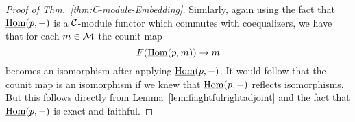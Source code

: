 \documentclass{amsart}
\begin{document}
\begin{proof}[Proof of Thm.~\ref{thm:C-module-Embedding}]
Similarly, again using the fact that $\operatorname{\underline{Hom}}(p,-)$ is a $\mathcal C$-module functor which commutes with coequalizers, we have that for each $m \in \mathcal M$ 
the counit map
\begin{equation*}
		F( \operatorname{\underline{Hom}}(p,m)) \to m
\end{equation*} 
becomes an isomorphism after applying $\operatorname{\underline{Hom}}(p,-)$. It would follow that the counit map is an isomorphism if we knew that $\operatorname{\underline{Hom}}(p,-)$ reflects isomorphisms. But this follows directly from Lemma~\ref{lem:fiaghtfulrightadjoint} and the fact that $\operatorname{\underline{Hom}}(p,-)$ is exact and faithful. 
\end{proof}


\end{document}
